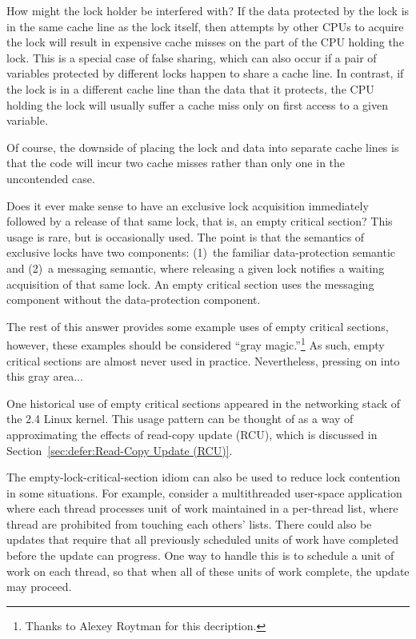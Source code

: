 \begin{enumerate}
\QuickQ{}
	How might the lock holder be interfered with?
\QuickA{}
	If the data protected by the lock is in the same cache line
	as the lock itself, then attempts by other CPUs to acquire
	the lock will result in expensive cache misses on the part
	of the CPU holding the lock.
	This is a special case of false sharing, which can also occur
	if a pair of variables protected by different locks happen
	to share a cache line.
	In contrast, if the lock is in a different cache line than
	the data that it protects, the CPU holding the lock will
	usually suffer a cache miss only on first access to a given
	variable.

	Of course, the downside of placing the lock and data into separate
	cache lines is that the code will incur two cache misses rather
	than only one in the uncontended case.

\QuickQ{}
	Does it ever make sense to have an exclusive lock acquisition
	immediately followed by a release of that same lock, that is,
	an empty critical section?
\QuickA{}
	This usage is rare, but is occasionally used.
	The point is that the semantics of exclusive locks have two
	components: (1)~the familiar data-protection semantic and
	(2)~a messaging semantic, where releasing a given lock notifies
	a waiting acquisition of that same lock.
	An empty critical section uses the messaging component without
	the data-protection component.

	The rest of this answer provides some example uses of empty
	critical sections, however, these examples should be considered
	``gray magic.''\footnote{
		Thanks to Alexey Roytman for this decription.}
	As such, empty critical sections are almost never used in practice.
	Nevertheless, pressing on into this gray area...

	One historical use of empty critical sections appeared in the
	networking stack of the 2.4 Linux kernel.
	This usage pattern can be thought of as a way of approximating
	the effects of read-copy update (RCU), which is discussed in
	Section~\ref{sec:defer:Read-Copy Update (RCU)}.

	The empty-lock-critical-section idiom can also be used to
	reduce lock contention in some situations.
	For example, consider a multithreaded user-space application where
	each thread processes unit of work maintained in a per-thread
	list, where thread are prohibited from touching each others'
	lists.
	There could also be updates that require that all previously
	scheduled units of work have completed before the update can
	progress.
	One way to handle this is to schedule a unit of work on each
	thread, so that when all of these units of work complete, the
	update may proceed.


\end{enumerate}
